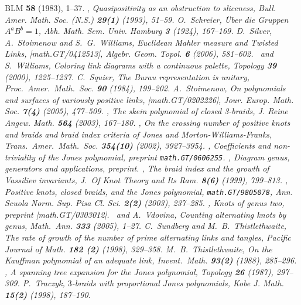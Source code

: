 {\begin{thebibliography}{BLM}
	{\bf 58} (1983), 1--37.
 \bysame, \em{Quasipositivity as an
	obstruction to sliceness}, Bull. Amer. Math. Soc. (N.S.)
	{\bf 29(1)} (1993), 51--59.
 O.~Schreier, \em{\"Uber die Gruppen $A^aB^b=1$},
	Abh. Math. Sem. Univ. Hamburg {\bf 3} (1924), 167--169.
 D.~Silver, A.~Stoimenow and S.~G.~Williams, \em{%
	Euclidean Mahler measure and Twisted Links},
	\web|math.GT/0412513|,
	Algebr. Geom. Topol. {\bf 6} (2006), 581--602.
 \bysame\, and S.~Williams, \em{Coloring link diagrams
	with a continuous palette}, Topology {\bf 39} (2000),
	1225--1237.
 C.\ Squier, \em{The Burau representation is
  	unitary}, Proc.\ Amer.\ Math.~Soc. {\bf 90} (1984), 199--202.
 A.~Stoimenow, {\em On polynomials and surfaces of
	variously positive links}, \web|math.GT/0202226|,
	Jour. Europ. Math. Soc. {\bf 7(4)} (2005), 477--509.
 \bysame, {\em The skein polynomial of closed
	3-braids}, J. Reine Angew. Math. {\bf 564} (2003), 167--180.
 \bysame, {\em On the crossing number of
   	positive knots and braids and braid index criteria of Jones
	and Morton-Williams-Franks},
        Trans.\ Amer.\ Math.\ Soc. {\bf 354(10)} (2002), 3927--3954.
 \bysame, {\em Coefficients and non-triviality
	of the Jones polynomial}, preprint {\tt math.GT/0606255}.
 \bysame, {\em Diagram genus, generators and
	applications}, preprint.
 \bysame, {\em The braid index and the growth of
	Vassiliev invariants}, J.~Of Knot Theory and Its Ram.
	{\bf 8(6)} (1999), 799--813.
 \bysame, {\em Positive knots, closed braids,
	and the Jones polynomial}, {\tt math.GT/9805078}, Ann. Scuola
	Norm. Sup. Pisa Cl. Sci. {\bf 2(2)} (2003), 237--285.
\bysame, {\em Knots of genus two}, preprint
	\web|math.GT/0303012|.
 \bysame\ and A.\ Vdovina, {\em Counting alternating
  	knots by genus}, Math.\ Ann. {\bf 333} (2005), 1--27.
 C.~Sundberg and M.~B.~Thistlethwaite, {\em The
	rate of growth of the number of prime alternating links and
	tangles}, Pacific Journal of Math. {\bf 182 (2)} (1998),
	329--358.
 M.~B.~Thistlethwaite, {\em On the Kauffman
	polynomial of an adequate link}, Invent.\ Math. {\bf 93(2)}
	(1988), 285--296.
 \bysame, {\em A spanning tree expansion for the
	Jones polynomial}, Topology {\bf 26} (1987), 297--309.
 P.~Traczyk, \em{$3$-braids with proportional
  	Jones polynomials}, Kobe J. Math. {\bf 15(2)} (1998), 187--190.

\end{thebibliography}}
